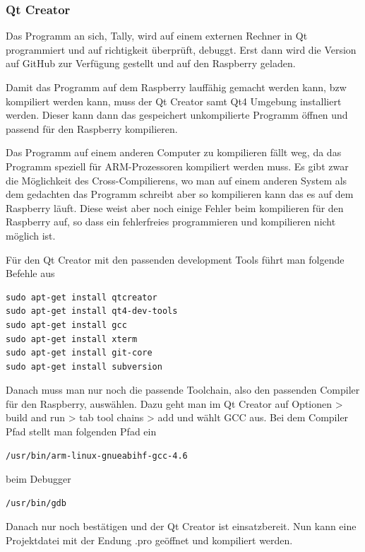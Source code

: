 \documentclass[11pt,a4paper]{article} %
\begin{document}
\subsubsection{Qt Creator}
Das Programm an sich, Tally, wird auf einem externen Rechner in Qt programmiert und auf richtigkeit überprüft, debuggt. Erst dann wird die Version auf GitHub zur Verfügung gestellt und auf den Raspberry geladen.
\par
Damit das Programm auf dem Raspberry lauffähig gemacht werden kann, bzw kompiliert werden kann, muss der Qt Creator\cite{4} samt Qt4 Umgebung installiert werden. Dieser kann dann das gespeichert unkompilierte Programm öffnen und passend für den Raspberry kompilieren.
\par
Das Programm auf einem anderen Computer zu kompilieren fällt weg, da das Programm speziell für ARM-Prozessoren kompiliert werden muss. Es gibt zwar die Möglichkeit des Cross-Compilierens, wo man auf einem anderen System als dem gedachten das Programm schreibt aber so kompilieren kann das es auf dem Raspberry läuft. Diese weist aber noch einige Fehler beim kompilieren für den Raspberry auf, so dass ein fehlerfreies programmieren und kompilieren nicht möglich ist.
\par
Für den Qt Creator mit den passenden development Tools führt man folgende Befehle aus
 \begin{frame}

\begin{lstlisting}
sudo apt-get install qtcreator
sudo apt-get install qt4-dev-tools
sudo apt-get install gcc
sudo apt-get install xterm
sudo apt-get install git-core
sudo apt-get install subversion
\end{lstlisting}

\end{frame}
\newpage
Danach muss man nur noch die passende Toolchain, also den passenden Compiler für den Raspberry, auswählen. Dazu geht man im Qt Creator auf Optionen > build and run > tab tool chains > add und wählt GCC aus. Bei dem Compiler Pfad stellt man folgenden Pfad ein
\begin{frame}

\begin{lstlisting}
/usr/bin/arm-linux-gnueabihf-gcc-4.6 
\end{lstlisting}

\end{frame} 
beim Debugger
  \begin{frame}

\begin{lstlisting}
/usr/bin/gdb
\end{lstlisting}

\end{frame}
Danach nur noch bestätigen und der Qt Creator ist einsatzbereit. Nun kann eine Projektdatei mit der Endung .pro geöffnet und kompiliert werden.
\par
\end{document}
